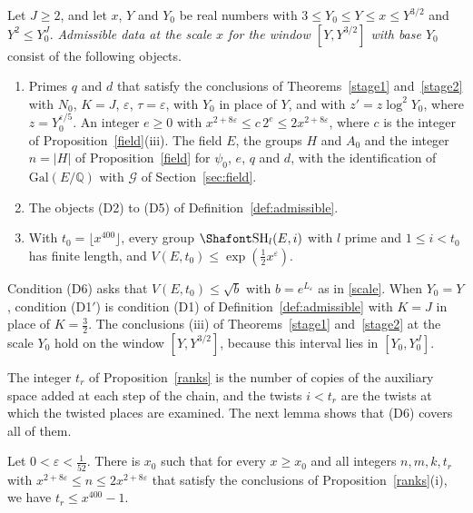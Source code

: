 \begin{definition}\label{r6:R6:def:adm}
Let $J\ge2$, and let $x$, $Y$ and $Y_0$ be real numbers with $3\le Y_0\le Y\le x\le Y^{3/2}$ and $Y^2\le Y_0^J$. \emph{Admissible data at the scale $x$ for the window $[Y,Y^{3/2}]$ with base $Y_0$} consist of the following objects.
\begin{enumerate}
\item[(D1$'$)] Primes $q$ and $d$ that satisfy the conclusions of Theorems~\ref{stage1} and~\ref{stage2} with $N_0$, $K=J$, $\varepsilon$, $\tau=\varepsilon$, with $Y_0$ in place of $Y$, and with $z'=z\log^2Y_0$, where $z=Y_0^{\varepsilon/5}$. An integer $e\ge0$ with $x^{2+8\varepsilon}\le c\,2^e\le2x^{2+8\varepsilon}$, where $c$ is the integer of Proposition~\ref{field}(iii). The field $E$, the groups $H$ and $A_0$ and the integer $n=\lvert H\rvert$ of Proposition~\ref{field} for $\psi_0$, $e$, $q$ and $d$, with the identification of $\mathrm{Gal}(E/\mathbb Q)$ with $\mathcal G$ of Section~\ref{sec:field}.
\item[(D2)--(D5)] The objects (D2) to (D5) of Definition~\ref{def:admissible}.
\item[(D6)] With $t_0=\lfloor x^{400}\rfloor$, every group $\Sha_l(E,i)$ with $l$ prime and $1\le i<t_0$ has finite length, and $V(E,t_0)\le\exp(\frac12x^{\varepsilon})$.
\end{enumerate}
\end{definition}

Condition (D6) asks that $V(E,t_0)\le\sqrt b$ with $b=e^{L_\varepsilon}$ as in \eqref{scale}. When $Y_0=Y$, condition (D1$'$) is condition (D1) of Definition~\ref{def:admissible} with $K=J$ in place of $K=\frac32$. The conclusions (iii) of Theorems~\ref{stage1} and~\ref{stage2} at the scale $Y_0$ hold on the window $[Y,Y^{3/2}]$, because this interval lies in $[Y_0,Y_0^J]$.

The integer $t_r$ of Proposition~\ref{ranks} is the number of copies of the auxiliary space added at each step of the chain, and the twists $i<t_r$ are the twists at which the twisted places are examined. The next lemma shows that (D6) covers all of them.

\begin{lemma}\label{r6:R6:lem:tr}
Let $0<\varepsilon<\frac1{52}$. There is $x_0$ such that for every $x\ge x_0$ and all integers $n,m,k,t_r$ with $x^{2+8\varepsilon}\le n\le2x^{2+8\varepsilon}$ that satisfy the conclusions of Proposition~\ref{ranks}(i), we have $t_r\le x^{400}-1$.
\end{lemma}

